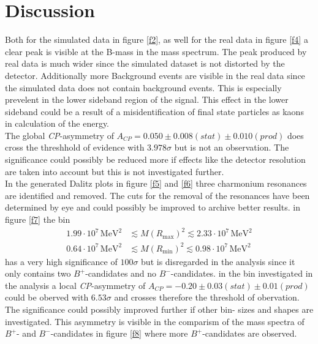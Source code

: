 \section{Discussion}
\label{sec:Diskussion}
Both for the simulated data in figure \ref{f2}, as well for the real data in figure \ref{f4} a clear peak is visible at the B-mass in the 
mass spectrum. The peak produced by real data is much wider since the simulated dataset is not distorted by the detector. Additionally 
more Background events are visible in the real data since the simulated data does not contain background events. This is especially 
prevelent in the lower sideband region of the signal. This effect in the lower sideband could be a result of a misidentification of final state 
particles as kaons in calculation of the energy. \\
The global \textit{CP}-asymmetry of $A_\textit{CP} = 0.050 \pm 0.008 (stat) \pm 0.010 (prod)$ does cross the threshhold of evidence with $3.978 \sigma$ 
but is not an observation. The significance 
could possibly be reduced more if effects like the detector resolution are taken into account but this is not investigated further. \\
In the generated Dalitz plots in figure \ref{f5} and \ref{f6} three charmonium resonances are identified and removed. The cuts for the 
removal of the resonances have been determined by eye and could possibly be improved to archive better results. 
in figure \ref{f7} the bin 
\begin{align*}
    1.99 \cdot 10^{7} \, \si{\mega\eV\squared} &\lesssim M(R_\text{max})^2 \lesssim 2.33 \cdot 10^{7} \, \si{\mega\eV\squared} \\
    0.64 \cdot 10^{7} \, \si{\mega\eV\squared} &\lesssim M(R_\text{min})^2 \lesssim 0.98 \cdot 10^{7} \, \si{\mega\eV\squared}
\end{align*}
has a very high significance of $100 \sigma$ but is disregarded in the analysis since it only contains two $B^+$-candidates and no $B^-$-candidates. 
in the bin investigated in the analysis a local \textit{CP}-asymmetry of $A_\textit{CP} = -0.20 \pm 0.03(stat)  \pm 0.01(prod)$ could be oberved 
with $6.53 \sigma$ and crosses therefore the threshold of obervation. The significance could possibly improved further if other bin- sizes and shapes are 
investigated. This asymmetry is visible in the comparism of the mass spectra of $B^+$- and $B^-$-candidates in figure \ref{f8} where more 
$B^+$-candidates are observed.